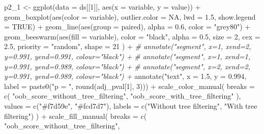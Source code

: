 \documentclass[
  11pt,
  oneside]{book}
\newenvironment{Shaded}{\begin{snugshade}}{\end{snugshade}}
\newcommand{\AttributeTok}[1]{\textcolor[rgb]{0.77,0.63,0.00}{#1}}
\newcommand{\CommentTok}[1]{\textcolor[rgb]{0.56,0.35,0.01}{\textit{#1}}}
\newcommand{\ConstantTok}[1]{\textcolor[rgb]{0.00,0.00,0.00}{#1}}
\newcommand{\DecValTok}[1]{\textcolor[rgb]{0.00,0.00,0.81}{#1}}
\newcommand{\FloatTok}[1]{\textcolor[rgb]{0.00,0.00,0.81}{#1}}
\newcommand{\FunctionTok}[1]{\textcolor[rgb]{0.00,0.00,0.00}{#1}}
\newcommand{\NormalTok}[1]{#1}
\newcommand{\OtherTok}[1]{\textcolor[rgb]{0.56,0.35,0.01}{#1}}
\newcommand{\SpecialCharTok}[1]{\textcolor[rgb]{0.00,0.00,0.00}{#1}}
\newcommand{\StringTok}[1]{\textcolor[rgb]{0.31,0.60,0.02}{#1}}
\begin{document}
\begin{Shaded}
\begin{Highlighting}[]
\NormalTok{p2\_1 }\OtherTok{\textless{}{-}} \FunctionTok{ggplot}\NormalTok{(}\AttributeTok{data =}\NormalTok{ ds[[}\DecValTok{1}\NormalTok{]], }\FunctionTok{aes}\NormalTok{(}\AttributeTok{x =}\NormalTok{ variable, }\AttributeTok{y =}\NormalTok{ value)) }\SpecialCharTok{+}
  \FunctionTok{geom\_boxplot}\NormalTok{(}\FunctionTok{aes}\NormalTok{(}\AttributeTok{color =}\NormalTok{ variable), }\AttributeTok{outlier.color =} \ConstantTok{NA}\NormalTok{, }\AttributeTok{lwd =} \FloatTok{1.5}\NormalTok{, }\AttributeTok{show.legend =} \ConstantTok{TRUE}\NormalTok{) }\SpecialCharTok{+}
  \FunctionTok{geom\_line}\NormalTok{(}\FunctionTok{aes}\NormalTok{(}\AttributeTok{group =}\NormalTok{ paired), }\AttributeTok{alpha =} \FloatTok{0.6}\NormalTok{, }\AttributeTok{color =} \StringTok{"grey80"}\NormalTok{) }\SpecialCharTok{+}
  \FunctionTok{geom\_beeswarm}\NormalTok{(}\FunctionTok{aes}\NormalTok{(}\AttributeTok{fill =}\NormalTok{ variable),}
    \AttributeTok{color =} \StringTok{"black"}\NormalTok{, }\AttributeTok{alpha =} \FloatTok{0.5}\NormalTok{, }\AttributeTok{size =} \DecValTok{2}\NormalTok{, }\AttributeTok{cex =} \FloatTok{2.5}\NormalTok{, }\AttributeTok{priority =} \StringTok{"random"}\NormalTok{,}
    \AttributeTok{shape =} \DecValTok{21}
\NormalTok{  ) }\SpecialCharTok{+}
  \CommentTok{\# annotate("segment", x=1, xend=2, y=0.991, yend=0.991, colour="black") +}
  \CommentTok{\# annotate("segment", x=1, xend=1, y=0.991, yend=0.989, colour="black") +}
  \CommentTok{\# annotate("segment", x=2, xend=2, y=0.991, yend=0.989, colour="black") +}
  \FunctionTok{annotate}\NormalTok{(}\StringTok{"text"}\NormalTok{, }\AttributeTok{x =} \FloatTok{1.5}\NormalTok{, }\AttributeTok{y =} \FloatTok{0.994}\NormalTok{, }\AttributeTok{label =} \FunctionTok{paste0}\NormalTok{(}\StringTok{"p = "}\NormalTok{, }\FunctionTok{round}\NormalTok{(adj\_pval[}\DecValTok{1}\NormalTok{], }\DecValTok{3}\NormalTok{))) }\SpecialCharTok{+}
  \FunctionTok{scale\_color\_manual}\NormalTok{(}
    \AttributeTok{breaks =} \FunctionTok{c}\NormalTok{(}
      \StringTok{"oob\_score\_without\_tree\_filtering"}\NormalTok{,}
      \StringTok{"oob\_score\_with\_tree\_filtering"}
\NormalTok{    ),}
    \AttributeTok{values =} \FunctionTok{c}\NormalTok{(}\StringTok{"\#f7d59e"}\NormalTok{, }\StringTok{"\#fcd7d7"}\NormalTok{),}
    \AttributeTok{labels =} \FunctionTok{c}\NormalTok{(}\StringTok{"Without tree filtering"}\NormalTok{, }\StringTok{"With tree filtering"}\NormalTok{)}
\NormalTok{  ) }\SpecialCharTok{+}
  \FunctionTok{scale\_fill\_manual}\NormalTok{(}
    \AttributeTok{breaks =} \FunctionTok{c}\NormalTok{(}
      \StringTok{"oob\_score\_without\_tree\_filtering"}\NormalTok{,}

\end{Highlighting}
\end{Shaded}
\end{document}
